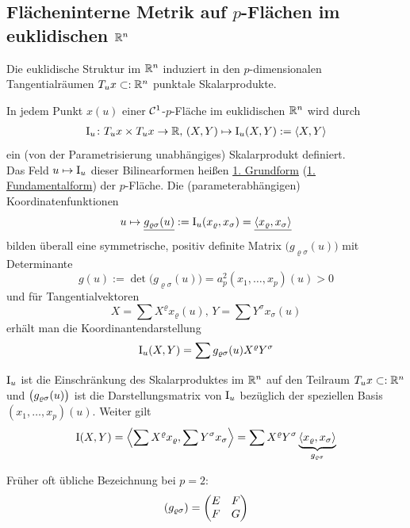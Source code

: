 \subsection{Flächeninterne Metrik auf $p$-Flächen im euklidischen $\mathbb{R}^n$}
Die euklidische Struktur im \(\mathbb{R}^n\) induziert in den \(p\)-dimensionalen Tangentialräumen \(T_u x \subset: \mathbb{R}^n\) punktale Skalarprodukte.

\begin{satz}\label{satz211}
 In jedem Punkt \(x(u)\) einer \(\mathcal{C}^1\)-\(p\)-Fläche im euklidischen \(\mathbb{R}^n\) wird durch
 \begin{align*}
  \Rom 1_u \colon T_u x \times T_u x \to \IR, \, (X,Y) \mapsto \Rom 1_u (X,Y) := \langle X, Y \rangle
 \end{align*}
ein (von der Parametrisierung unabhängiges) Skalarprodukt definiert. \\
Das Feld \(u \mapsto \Rom 1_u\) dieser Bilinearformen heißen \uline{1. Grundform} (\uline{1. Fundamentalform}) der \(p\)-Fläche. Die (parameterabhängigen) Koordinatenfunktionen
\[
 u \mapsto \uline{g_{\varrho \sigma} (u)} := \Rom 1_u ( x_\varrho, x_\sigma) = \uline{\langle x_\varrho, x_\sigma \rangle}
\]
bilden überall eine symmetrische, positiv definite Matrix \(\big(g_{\varrho \sigma}(u)\big)\) mit Determinante
\[
 g(u) := \det \big(g_{\varrho \sigma}(u)\big) = a_p^2 (x_1, \dots, x_p)(u) > 0
\]
und für Tangentialvektoren
\[
 X = \sum X^\varrho x_\varrho (u), \, Y = \sum Y^\sigma x_\sigma(u)
\]
erhält man die Koordinantendarstellung
\begin{align*}
\Rom 1_u (X,Y) = \sum g_{\varrho \sigma}(u) X^\varrho Y^\sigma
\end{align*}
\end{satz}

\begin{beweis}
 \(\Rom 1_u\) ist die Einschränkung des Skalarproduktes im \(\mathbb{R}^n\) auf den Teilraum \(T_u x \subset: \mathbb{R}^n\) und \(\big(g_{\varrho \sigma}(u)\big)\) ist die Darstellungsmatrix von \(\Rom 1_u\) bezüglich der speziellen Basis \((x_1, \dots, x_p)(u)\). Weiter gilt
 \[
  \Rom 1( X,Y) = \left\langle\sum X^\varrho x_\varrho, \sum Y^\sigma x_\sigma \right\rangle = \sum X^\varrho Y^\sigma \underbrace{\langle x_\varrho, x_\sigma\rangle}_{\grs}
 \]
\end{beweis}
 Früher oft übliche Bezeichnung bei \(p = 2\):
 \begin{align*}
  (g_{\varrho \sigma}) = \begin{pmatrix}
            E & F \\
            F & G
           \end{pmatrix}
 \end{align*}
